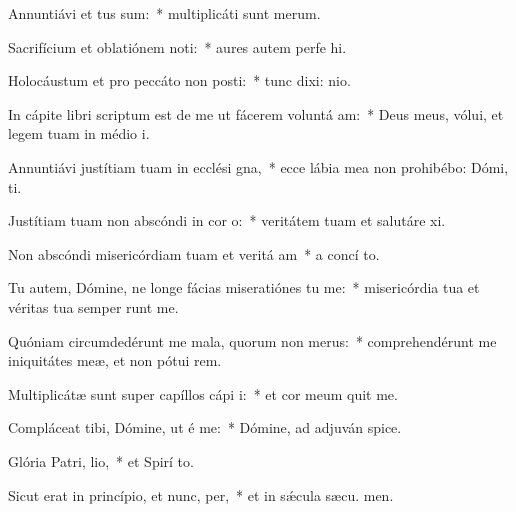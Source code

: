 \item Annuntiávi et tus sum:~* multiplicáti sunt  merum.
\item Sacrifícium et oblatiónem noti:~* aures autem perfe hi.
\item Holocáustum et pro peccáto non posti:~* tunc dixi:  nio.
\item In cápite libri scriptum est de me ut fácerem voluntá am:~* Deus meus, vólui, et legem tuam in médio  i.
\item Annuntiávi justítiam tuam in ecclési gna,~* ecce lábia mea non prohibébo: Dómi,  ti.
\item Justítiam tuam non abscóndi in cor o:~* veritátem tuam et salutáre  xi.
\item Non abscóndi misericórdiam tuam et veritá am~* a concí to.
\item Tu autem, Dómine, ne longe fácias miseratiónes tu  me:~* misericórdia tua et véritas tua semper runt me.
\item Quóniam circumdedérunt me mala, quorum non  merus:~* comprehendérunt me iniquitátes meæ, et non pótui  rem.
\item Multiplicátæ sunt super capíllos cápi i:~* et cor meum quit me.
\item Compláceat tibi, Dómine, ut é me:~* Dómine, ad adjuván  spice.
\item Glória Patri,  lio,~* et Spirí to.
\item Sicut erat in princípio, et nunc,  per,~* et in sǽcula sæcu. men.
